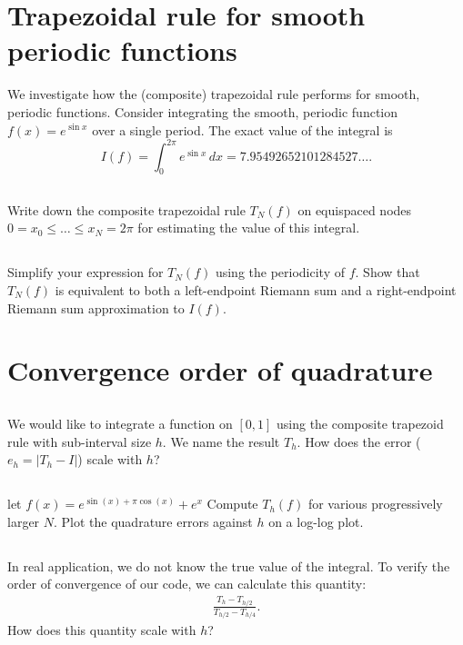 \documentclass{article}%
\begin{document}
\section{Trapezoidal rule for smooth periodic functions}

We investigate how the (composite) trapezoidal rule performs for smooth, periodic functions. Consider integrating the smooth, periodic function $f(x) = e^{\sin x}$ over a single period. The exact value of the integral is
\[
I(f) = \int_0^{2\pi} e^{\sin x} \, d x = 7.95492652101284527\dots.
\]

\subsection{}
Write down the composite trapezoidal rule $T_N(f)$ on equispaced nodes $0=x_0 \le  \dots \le x_N = 2\pi$ for estimating the value of this integral. 

\subsection{}
Simplify your expression for $T_N(f)$ using the periodicity of $f$.
Show that $T_N(f)$ is equivalent to both a left-endpoint Riemann sum and a right-endpoint Riemann sum approximation to $I(f)$.



\section{Convergence order of quadrature}
\subsection{}
We would like to integrate a function on $[0,1]$ using the composite trapezoid rule with sub-interval size $h$. We name the result $T_h$. How does the error ($e_h = |T_h-I|$) scale with $h$?

\subsection{}
let $f(x)=e^{\sin(x)+\pi \cos(x)}+e^x$
Compute $T_h(f)$ for various progressively larger $N$. Plot the quadrature errors against $h$ on a log-log plot.
\subsection{}
In real application, we do not know the true value of the integral. To verify the order of convergence of our code, we can calculate this quantity:
\begin{align*}
    \frac{T_h-T_{h/2}}{T_{h/2}-T_{h/4}}.
\end{align*}
How does this quantity scale with $h$?
\end{document}
